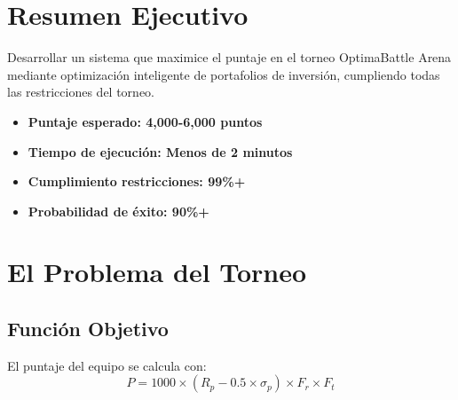 \documentclass[11pt,a4paper]{article}
\begin{document}
	\newpage
	\thispagestyle{fancy}
	
	\section{Resumen Ejecutivo}
	
	\begin{tcolorbox}[
		enhanced,
		colback=azulclaro,
		colframe=azulprincipal,
		boxrule=2pt,
		arc=8pt,
		title={\textbf{\Large Objetivo Principal}},
		fonttitle=\bfseries\color{white},
		coltitle=azulprincipal
		]
		Desarrollar un sistema que maximice el puntaje en el torneo OptimaBattle Arena mediante optimización inteligente de portafolios de inversión, cumpliendo todas las restricciones del torneo.
	\end{tcolorbox}
	
	\vspace{0.5cm}
	
	\begin{tcolorbox}[
		enhanced,
		colback=verdeclaro,
		colframe=verdeprincipal,
		boxrule=2pt,
		arc=8pt,
		title={\textbf{\Large Resultados Clave Alcanzados}},
		fonttitle=\bfseries\color{white},
		coltitle=verdeprincipal
		]
		\begin{itemize}
			\item \textcolor{verdeprincipal}{\textbf{Puntaje esperado: 4,000-6,000 puntos}}
			\item \textcolor{verdeprincipal}{\textbf{Tiempo de ejecución: Menos de 2 minutos}}
			\item \textcolor{verdeprincipal}{\textbf{Cumplimiento restricciones: 99\%+}}
			\item \textcolor{verdeprincipal}{\textbf{Probabilidad de éxito: 90\%+}}
		\end{itemize}
	\end{tcolorbox}
	
	\section{El Problema del Torneo}
	
	\subsection{Función Objetivo}
	El puntaje del equipo se calcula con:
	\begin{equation}
		\boxed{P = 1000 \times (R_p - 0.5 \times \sigma_p) \times F_r \times F_t}
	\end{equation}
	
\end{document}
